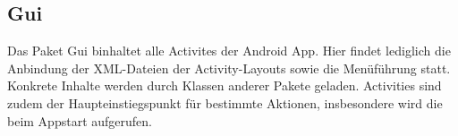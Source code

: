 \label{app:module:gui}\subsection{Gui}
Das Paket Gui binhaltet alle Activites der Android App. Hier findet lediglich die Anbindung der XML-Dateien der Activity-Layouts sowie die Menüführung statt. Konkrete Inhalte werden durch Klassen anderer Pakete geladen. Activities sind zudem der Haupteinstiegspunkt für bestimmte Aktionen, insbesondere wird die  beim Appstart aufgerufen.